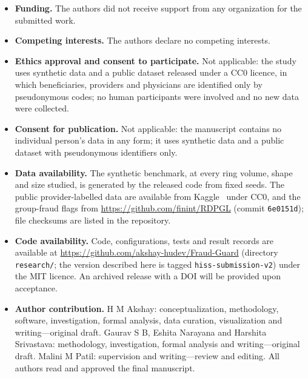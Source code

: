\documentclass[pdflatex,sn-vancouver-num]{sn-jnl}
\begin{document}
\begin{itemize}
\item \textbf{Funding.} The authors did not receive support from any organization for the submitted work.
\item \textbf{Competing interests.} The authors declare no competing interests.
\item \textbf{Ethics approval and consent to participate.} Not applicable: the
  study uses synthetic data and a public dataset released under a CC0 licence,
  in which beneficiaries, providers and physicians are identified only by
  pseudonymous codes; no human participants were involved and no new data
  were collected.
\item \textbf{Consent for publication.} Not applicable: the manuscript
  contains no individual person's data in any form; it uses synthetic data
  and a public dataset with pseudonymous identifiers only.
\item \textbf{Data availability.} The synthetic benchmark, at every ring
  volume, shape and size studied, is generated by the released code from fixed seeds. The
  public provider-labelled data are available from Kaggle~\cite{kaggle2019}
  under CC0, and the group-fraud flags from
  \url{https://github.com/finint/RDPGL} (commit \texttt{6e0151d}); file
  checksums are listed in the repository.
\item \textbf{Code availability.} Code, configurations, tests and result
  records are available at \url{https://github.com/akshay-hudev/Fraud-Guard}
  (directory \texttt{research/}; the version described here is tagged
  \texttt{hiss-submission-v2}) under the MIT licence. An archived release
  with a DOI will be provided upon acceptance.
\item \textbf{Author contribution.} H M Akshay: conceptualization,
  methodology, software, investigation, formal analysis, data curation,
  visualization and writing---original draft. Gaurav S B, Eshita Narayana
  and Harshita Srivastava: methodology, investigation, formal analysis and
  writing---original draft. Malini M Patil: supervision and writing---review
  and editing. All authors read and approved the final manuscript.
\end{itemize}
\end{document}
